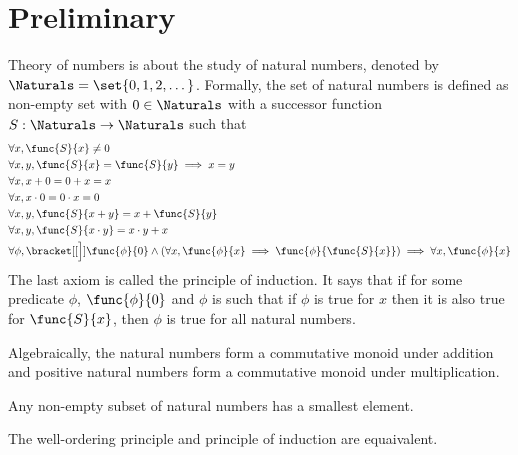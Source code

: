 \chapter{Preliminary}

Theory of numbers is about the study of natural numbers, denoted by \(\Naturals = \set{0,1,2,\dots}\). Formally, the set of natural numbers is defined as non-empty set with \(0 \in \Naturals\) with a successor function \(S : \Naturals \to \Naturals\) such that 
\begin{align}
    & \forall x, \func{S}{x} \neq 0\\
    & \forall x,y, \func{S}{x} = \func{S}{y} \implies x = y\\
    & \forall x, x + 0 = 0 + x = x\\
    & \forall x, x \cdot 0 = 0 \cdot x = 0\\
    & \forall x,y, \func{S}{x + y} = x + \func{S}{y}\\
    & \forall x,y, \func{S}{x \cdot y} = x \cdot y + x\\
    & \forall \phi, \bracket[[\Big]]{\func{\phi}{0} \land (\forall x, \func{\phi}{x} \implies \func{\phi}{\func{S}{x}})} \implies \forall x, \func{\phi}{x} 
\end{align}
The last axiom is called the principle of induction. It says that if for some predicate \(\phi\), \(\func{\phi}{0}\) and \(\phi\) is such that if \(\phi\) is true for \(x\) then it is also true for \(\func{S}{x}\), then \(\phi\) is true for all natural numbers.

Algebraically, the natural numbers form a commutative monoid under addition and positive natural numbers form a commutative monoid under multiplication.

\begin{definition}
    Any non-empty subset of natural numbers has a smallest element.
\end{definition}

\begin{theorem}
    The well-ordering principle and principle of induction are equaivalent.
\end{theorem}